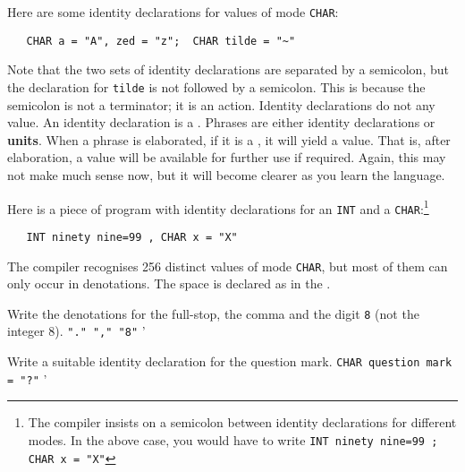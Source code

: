 Here are some identity declarations for values of mode \verb|CHAR|:
\begin{verbatim}
   CHAR a = "A", zed = "z";  CHAR tilde = "~"
\end{verbatim}
\noindent
Note that the two sets of identity declarations are separated by a
semicolon, but the declaration for \verb|tilde| is not followed by a
semicolon.  This is because the semicolon \ixtt{;} is not a
terminator; it is an action. Identity declarations do not
 any value. An identity declaration is a .
Phrases are either identity declarations or \textbf{units}.  When a
phrase is elaborated, if it is a , it will yield a value.
That is, after elaboration, a value will be available for further use
if required.  Again, this may not make much sense now, but it will
become clearer as you learn the language.

Here is a piece of program with identity declarations for an
\verb|INT| and a \verb|CHAR|:\footnote{The
\protect{}
compiler insists on a semicolon between identity declarations for
different modes. In the above case, you would have to write
\texttt{INT ninety nine=99 ; CHAR x = "X"}}
\begin{verbatim}
   INT ninety nine=99 , CHAR x = "X"
\end{verbatim}

The compiler recognises 256 distinct values of mode \verb|CHAR|, but
most of them can only occur in denotations. The space is declared as
 in the .

\begin{exercise}
\item Write the denotations for the full-stop, the comma and the
digit \verb|8| (not the integer 8).  \ans \verb|"." "," "8"|
'
\item Write a suitable identity declaration for the question mark.
\ans \verb|CHAR question mark = "?"|
'
\end{exercise}

